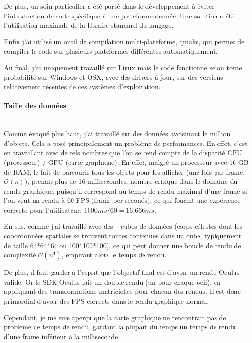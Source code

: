 \documentclass[a4paper,french,12pt]{article}
\begin{document}
		  De plus, un soin particulier a été porté dans le développement à éviter l'introduction 
		  de code spécifique à une plateforme donnée. Une solution a été l'utilisation maximale de la libraire 
		  standard du langage.
		  
		  Enfin j'ai utilisé un outil de compilation multi-plateforme, qmake, qui permet de compiler le code
		  sur plusieurs plateformes différentes automatiquement.
		  
		  Au final, j'ai uniquement travaillé sur Linux mais le code fonctionne selon toute probabilité sur 
		  Windows et OSX, avec des drivers à jour, sur des versions relativement récentes de ces systèmes d'exploitation.
		  
		\paragraph{Taille des données} ~\\
		
		  Comme évoqué plus haut, j'ai travaillé sur des données avoisinant le million d'objets. Cela a posé
		  principalement un problème de performances. En effet, c'est en travaillant avec de tels nombres que
		  l'on se rend compte de la disparité CPU (processeur) / GPU (carte graphique).
		  En effet, malgré un processeur avec 16 GB de RAM, le fait de parcourir tous les objets pour les afficher (une fois par frame, $\mathcal{O}(n)$),
		  prenait plus de 16 millisecondes, nombre critique dans le domaine du rendu graphique, puisqu'il
		  correspond au temps de rendu maximal d'une frame si l'on veut un rendu à 60 FPS (frame per seconds),
		  ce qui fournit une expérience correcte pour l'utilisateur: $1000 ms / 60 = 16.666 ms$.
		  
		  En sus, comme j'ai travaillé avec des +cubes de données (corps célestes dont les cooordonnées spatiales se trouvent toutes
		  contenues dans un cube, typiquement de taille 64*64*64 ou 100*100*100), ce qui peut donner une boucle de rendu
		  de complexité $\mathcal{O}(n^3)$, empirant alors le temps de rendu.
		  
		  De plus, il faut garder à l'esprit que l'objectif final est d'avoir un rendu Oculus valide. Or le
		  SDK Oculus fait un double rendu (un pour chaque oeil), en appliquant des transformations matricielles
		  pour chacun des rendus. Il est donc primordial d'avoir des FPS corrects dans le rendu graphique normal.
		  
		  Cependant, je me suis aperçu que la carte graphique ne rencontrait pas de problème de temps de rendu,
		  gardant la plupart du temps un temps de rendu d'une frame inférieur à la milliseconde.
		  
\end{document}
